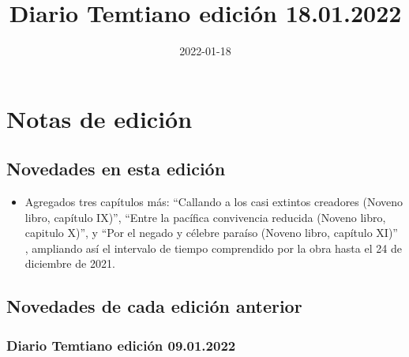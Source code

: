\documentclass[
  spanish,
]{book}
\title{Diario Temtiano edición 18.01.2022}
\author{}
\date{\vspace{-2.5em}2022-01-18}
\providecommand{\tightlist}{%
  \setlength{\itemsep}{0pt}\setlength{\parskip}{0pt}}
\begin{document}
\maketitle

{
\setcounter{tocdepth}{1}
\tableofcontents
}
\hypertarget{notas-de-ediciuxf3n}{%
\chapter*{Notas de edición}\label{notas-de-ediciuxf3n}}

\hypertarget{novedades-en-esta-ediciuxf3n}{%
\section*{Novedades en esta edición}\label{novedades-en-esta-ediciuxf3n}}

\begin{itemize}
\tightlist
\item
  Agregados tres capítulos más: ``Callando a los casi extintos creadores (Noveno libro, capítulo IX)'', ``Entre la pacífica convivencia reducida (Noveno libro, capitulo X)'', y ``Por el negado y célebre paraíso (Noveno libro, capítulo XI)'' , ampliando así el intervalo de tiempo comprendido por la obra hasta el 24 de diciembre de 2021.
\end{itemize}

\hypertarget{novedades-de-cada-ediciuxf3n-anterior}{%
\section*{Novedades de cada edición anterior}\label{novedades-de-cada-ediciuxf3n-anterior}}

\hypertarget{diario-temtiano-ediciuxf3n-09.01.2022}{%
\subsection*{Diario Temtiano edición 09.01.2022}\label{diario-temtiano-ediciuxf3n-09.01.2022}}
\end{document}
